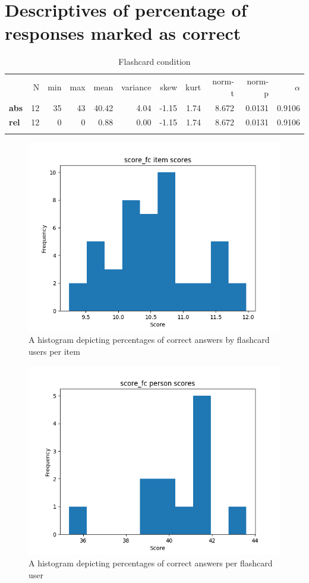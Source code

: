 \FloatBarrier
\section{Descriptives of percentage of responses marked as correct}

\begin{longtable}[c]{@{}lrrrrrrrrrr@{}}
\caption{Flashcard condition}
\endfirsthead
\toprule\addlinespace
& N & min & max & mean & variance & skew & kurt & norm-t &
norm-p & $\alpha$
\\\addlinespace
\midrule
\textbf{abs} & 12 & 35 & 43 & 40.42 & 4.04 & -1.15 & 1.74 & 8.672 &
0.0131 & 0.9106
\\\addlinespace
\textbf{rel} & 12 & 0 & 0 & 0.88 & 0.00 & -1.15 & 1.74 & 8.672 & 0.0131
& 0.9106
\\\addlinespace
\bottomrule
    \label{tab:score_fc}
\end{longtable}

\begin{figure}
    \centering
    \includegraphics[width=.7\textwidth]{img/score_fc_diff.png}
    \caption{A histogram depicting percentages of correct answers by flashcard users per item}
    \label{fig:score_fc_diff}
\end{figure}
\begin{figure}
    \centering
    \includegraphics[width=.7\textwidth]{img/score_fc_abil.png}
    \caption{A histogram depicting percentages of correct answers per flashcard user}
    \label{fig:score_fc_abil}
\end{figure}

